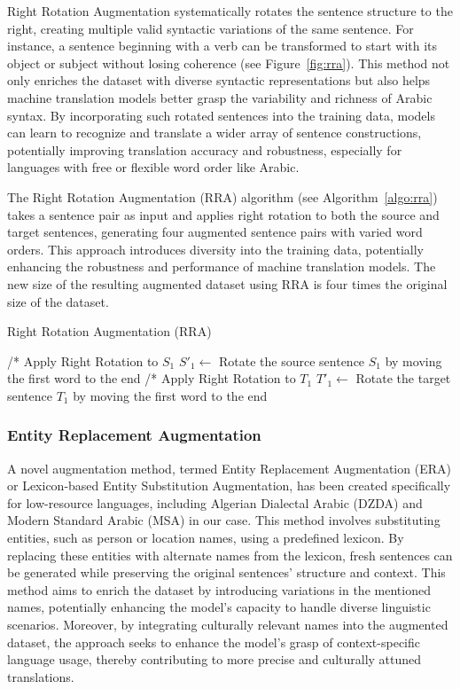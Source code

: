 Right Rotation Augmentation systematically rotates the sentence structure to the right, creating multiple valid syntactic variations of the same sentence. 
For instance, a sentence beginning with a verb can be transformed to start with its object or subject without losing coherence (see Figure~\ref{fig:rra}). 
This method not only enriches the dataset with diverse syntactic representations but also helps machine translation models better grasp the variability and richness of Arabic syntax. 
By incorporating such rotated sentences into the training data, models can learn to recognize and translate a wider array of sentence constructions, potentially improving translation accuracy and robustness, especially for languages with free or flexible word order like Arabic.

The Right Rotation Augmentation (RRA) algorithm (see Algorithm~\ref{algo:rra}) takes a sentence pair as input and applies right rotation to both the source and target sentences, generating four augmented sentence pairs with varied word orders. 
This approach introduces diversity into the training data, potentially enhancing the robustness and performance of machine translation models.
The new size of the resulting augmented dataset using RRA is four times the original size of the dataset.

\begin{algorithm}[H]
	\caption{Right Rotation Augmentation (RRA)}
	\label{algo:rra}
	\BlankLine
	/* Apply Right Rotation to $S_1$ \;
	$S'_1 \leftarrow$ Rotate the source sentence $S_1$ by moving the first word to the end\;
	/* Apply Right Rotation to $T_1$ \;
	$T'_1 \leftarrow$ Rotate the target sentence $T_1$ by moving the first word to the end\;
\end{algorithm}


\subsubsection{Entity Replacement Augmentation}
A novel augmentation method, termed Entity Replacement Augmentation (ERA) or Lexicon-based Entity Substitution Augmentation, has been created specifically for low-resource languages, including Algerian Dialectal Arabic (DZDA) and Modern Standard Arabic (MSA) in our case.
This method involves substituting entities, such as person or location names, using a predefined lexicon. 
By replacing these entities with alternate names from the lexicon, fresh sentences can be generated while preserving the original sentences' structure and context. 
This method aims to enrich the dataset by introducing variations in the mentioned names, potentially enhancing the model's capacity to handle diverse linguistic scenarios. 
Moreover, by integrating culturally relevant names into the augmented dataset, the approach seeks to enhance the model's grasp of context-specific language usage, thereby contributing to more precise and culturally attuned translations.

